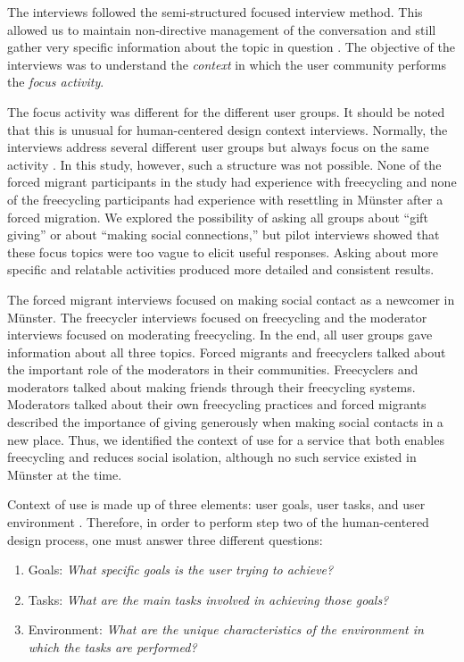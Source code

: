 The interviews followed the semi-structured focused interview method. This allowed us to maintain non-directive management of the conversation and still gather very specific information about the topic in question \cite{flick_companion_2004}. The objective of the interviews was to understand the \textit{context} in which the user community performs the \textit{focus activity}.

The focus activity was different for the different user groups. It should be noted that this is unusual for human-centered design context interviews. Normally, the interviews address several different user groups but always focus on the same activity \cite{riedemann_context_2018}. In this study, however, such a structure was not possible. None of the forced migrant participants in the study had experience with freecycling and none of the freecycling participants had experience with resettling in Münster after a forced migration. We explored the possibility of asking all groups about ``gift giving'' or about ``making social connections,'' but pilot interviews showed that these focus topics were too vague to elicit useful responses. Asking about more specific and relatable activities produced more detailed and consistent results.

The forced migrant interviews focused on making social contact as a newcomer in Münster. The freecycler interviews focused on freecycling and the moderator interviews focused on moderating freecycling. In the end, all user groups gave information about all three topics. Forced migrants and freecyclers talked about the important role of the moderators in their communities. Freecyclers and moderators talked about making friends through their freecycling systems. Moderators talked about their own freecycling practices and forced migrants described the importance of giving generously when making social contacts in a new place. Thus, we identified the context of use for a service that both enables freecycling and reduces social isolation, although no such service existed in Münster at the time.

Context of use is made up of three elements: user goals, user tasks, and user environment \cite{maguire_context_2001}. Therefore, in order to perform step two of the human-centered design process, one must answer three different questions:

\begin{enumerate}
    \item Goals: \textit{What specific goals is the user trying to achieve?}
    \item Tasks: \textit{What are the main tasks involved in achieving those goals?}
    \item Environment: \textit{What are the unique characteristics of the environment in which the tasks are performed?}
\end{enumerate}

